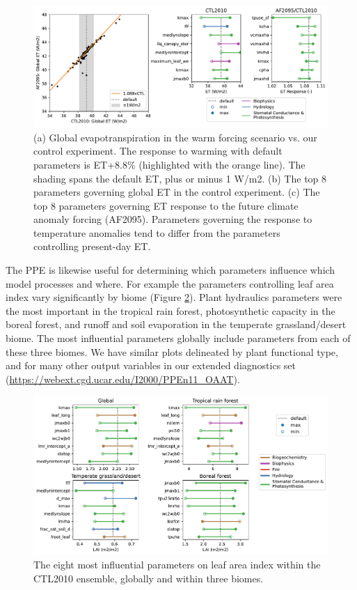 \documentclass[draft]{agujournal2019}
\begin{document}
\begin{figure}[h]
\centering
\includegraphics[width=\textwidth]{../figs/ET_response.pdf}
\caption{(a) Global evapotranspiration in the warm forcing scenario vs. our control experiment. The response to warming with default parameters is ET+8.8\% (highlighted with the orange line). The shading spans the default ET, plus or minus 1 W/m2.
(b) The top 8 parameters governing global ET in the control experiment.
(c) The top 8 parameters governing ET response to the future climate anomaly forcing (AF2095).
Parameters governing the response to temperature anomalies tend to differ from the parameters controlling present-day ET.}
\label{fig:et}
\end{figure}

The PPE is likewise useful for determining which parameters influence which model processes and where. For example the parameters controlling leaf area index vary significantly by biome (Figure \ref{fig:lai}). Plant hydraulics parameters were the most important in the tropical rain forest, photosynthetic capacity in the boreal forest, and runoff and soil evaporation in the temperate grassland/desert biome. The most influential parameters globally include parameters from each of these three biomes. We have similar plots delineated by plant functional type, and for many other output variables in our extended diagnostics set (\url{https://webext.cgd.ucar.edu/I2000/PPEn11_OAAT}). 

\begin{figure}[h]
\centering
\includegraphics[width=\textwidth]{../figs/lai_biome.pdf}
\caption{The eight most influential parameters on leaf area index within the CTL2010 ensemble, globally and within three biomes.}
\label{fig:lai}
\end{figure}
\end{document}

